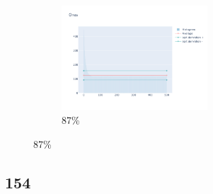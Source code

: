 \documentclass[12pt, fleqn]{report}                             %
\theoremstyle{break}                                            %
\begin{document}
\begin{figure}[ht!]
\begin{subfigure}[b]{0.4\linewidth}
          \includegraphics[width=0.6\textwidth]{Images/152/dia-d.png}
          \caption{87\%}
        \end{subfigure}
      \end{figure}


      \clearpage
      \subsection{154}
\end{document}

